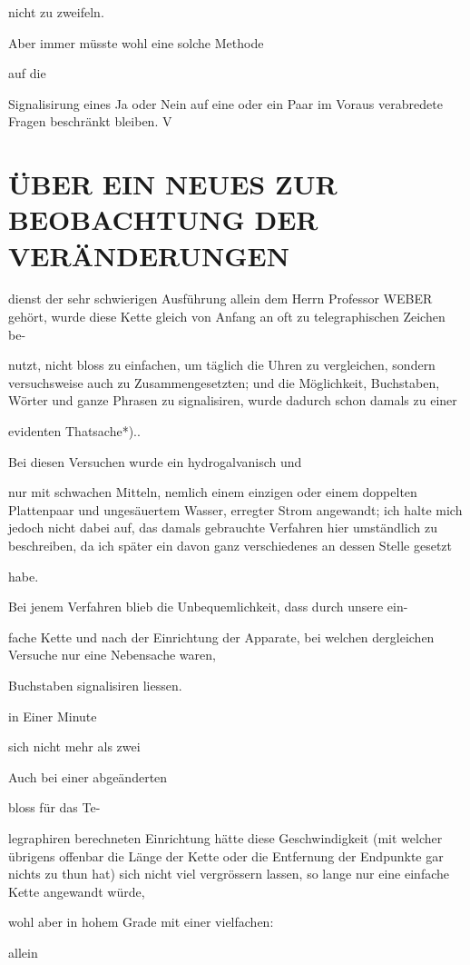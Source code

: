 \documentclass[12pt,a4paper]{article}
\begin{document}
nicht zu zweifeln.

Aber immer müsste wohl eine solche Methode

auf die

Signalisirung eines Ja oder Nein auf eine oder ein Paar im Voraus verabredete Fragen beschränkt bleiben. V

\section*{ÜBER EIN NEUES ZUR BEOBACHTUNG DER VERÄNDERUNGEN}
dienst der sehr schwierigen Ausführung allein dem Herrn Professor WEBER gehört, wurde diese Kette gleich von Anfang an oft zu telegraphischen Zeichen be-

nutzt, nicht bloss zu einfachen, um täglich die Uhren zu vergleichen, sondern versuchsweise auch zu Zusammengesetzten; und die Möglichkeit, Buchstaben, Wörter und ganze Phrasen zu signalisiren, wurde dadurch schon damals zu einer

evidenten Thatsache*)..

Bei diesen Versuchen wurde ein hydrogalvanisch und

nur mit schwachen Mitteln, nemlich einem einzigen oder einem doppelten Plattenpaar und ungesäuertem Wasser, erregter Strom angewandt; ich halte mich jedoch nicht dabei auf, das damals gebrauchte Verfahren hier umständlich zu beschreiben, da ich später ein davon ganz verschiedenes an dessen Stelle gesetzt

habe.

Bei jenem Verfahren blieb die Unbequemlichkeit, dass durch unsere ein-

fache Kette und nach der Einrichtung der Apparate, bei welchen dergleichen Versuche nur eine Nebensache waren,

Buchstaben signalisiren liessen.

in Einer Minute

sich nicht mehr als zwei

Auch bei einer abgeänderten

bloss für das Te-

legraphiren berechneten Einrichtung hätte diese Geschwindigkeit (mit welcher übrigens offenbar die Länge der Kette oder die Entfernung der Endpunkte gar nichts zu thun hat) sich nicht viel vergrössern lassen, so lange nur eine einfache Kette angewandt würde,

wohl aber in hohem Grade mit einer vielfachen:

allein
\end{document}
